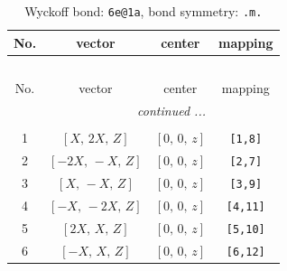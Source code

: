 \documentclass[fleqn,8pt]{jsarticle}
\begin{document}
\renewcommand{\arraystretch}{1.2}
\begin{longtable}{cccc}
\caption{Wyckoff bond: {\tt 6e@1a}, bond symmetry: {\tt .m.}}
 \\
 \hline \hline
No. & vector & center & mapping \\ \hline \endfirsthead

\multicolumn{3}{l}{\tablename\ \thetable{}} \\
 \hline \hline
No. & vector & center & mapping \\ \hline \endhead

 \hline \hline
\multicolumn{3}{r}{\footnotesize\it continued ...} \\ \endfoot

 \hline \hline
\multicolumn{3}{r}{} \\ \endlastfoot

1 & $\left[ X,\, 2 X,\, Z \right]$ & $\left[ 0,\, 0,\, z \right]$ & {\tt [1,8]} \\ \hline
2 & $\left[ - 2 X,\, - X,\, Z \right]$ & $\left[ 0,\, 0,\, z \right]$ & {\tt [2,7]} \\ \hline
3 & $\left[ X,\, - X,\, Z \right]$ & $\left[ 0,\, 0,\, z \right]$ & {\tt [3,9]} \\ \hline
4 & $\left[ - X,\, - 2 X,\, Z \right]$ & $\left[ 0,\, 0,\, z \right]$ & {\tt [4,11]} \\ \hline
5 & $\left[ 2 X,\, X,\, Z \right]$ & $\left[ 0,\, 0,\, z \right]$ & {\tt [5,10]} \\ \hline
6 & $\left[ - X,\, X,\, Z \right]$ & $\left[ 0,\, 0,\, z \right]$ & {\tt [6,12]} \\
\end{longtable}
\renewcommand{\arraystretch}{1.2}
\end{document}
